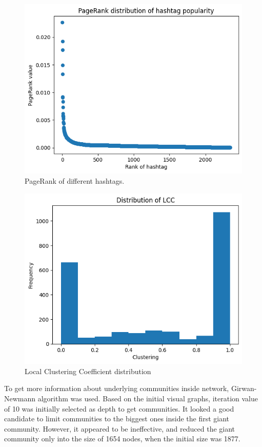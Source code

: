 \documentclass[conference]{IEEEtran}
\begin{document}
    \begin{figure}
        \includegraphics[scale=0.6]{figures/pagerank_distribution}
        \caption{PageRank of different hashtags.}
        \label{fig:pagerank}
    \end{figure}

    \begin{figure}
        \includegraphics[scale=0.6]{figures/lcc_distribution}
        \caption{Local Clustering Coefficient distribution}
        \label{fig:lcc}
    \end{figure}

    To get more information about underlying communities inside network, Girwan-Newmann algorithm was used.
    Based on the initial visual graphs, iteration value of 10 was initially selected as depth to get communities.
    It looked a good candidate to limit communities to the biggest ones inside the first giant community.
    However, it appeared to be ineffective, and reduced the giant community only into the size of 1654 nodes, when the initial size was 1877.
\end{document}
